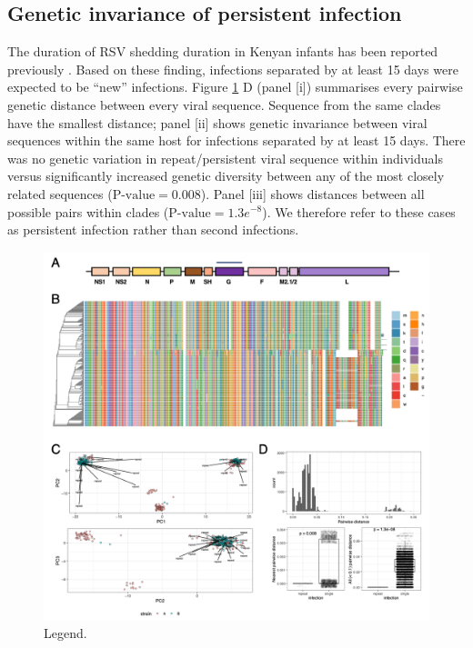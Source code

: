\documentclass{article}
\begin{document}
\subsection{Genetic invariance of persistent infection}
The duration of RSV shedding duration in Kenyan infants has been reported previously
\cite{okiro2010duration}.
Based on these finding, infections separated by at least 15 days were expected to be ``new'' infections. 
Figure \ref{fig:2} D (panel [i]) summarises every pairwise genetic distance between every viral sequence.
Sequence from the same clades have the smallest distance; panel [ii] shows genetic invariance between viral sequences within the same host for infections separated by at least 15 days. 
There was no genetic variation in repeat/persistent viral sequence within individuals versus significantly increased genetic diversity between any of the most closely related sequences ($\text{P-value} = 0.008$).
Panel [iii] shows distances between all possible pairs within clades ($\text{P-value} = 1.3e^{-8}$).
We therefore refer to these cases as persistent infection rather than second infections.

\begin{figure}[ht] \hspace{-0.5cm} 
    \includegraphics[scale=0.8]{f2}
	\caption{Legend.}
	\label{fig:2} 
\end{figure}
\end{document}
